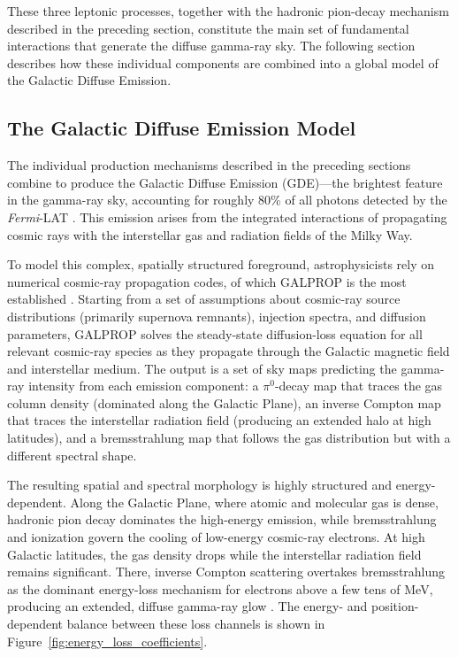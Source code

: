 These three leptonic processes, together with the hadronic pion-decay mechanism described in the preceding section, constitute the main set of fundamental interactions that generate the diffuse gamma-ray sky.
The following section describes how these individual components are combined into a global model of the Galactic Diffuse Emission.

\subsection{The Galactic Diffuse Emission Model}
\label{sec:gde_model}

The individual production mechanisms described in the preceding sections combine to produce the Galactic Diffuse Emission (GDE)---the brightest feature in the gamma-ray sky, accounting for roughly 80\% of all photons detected by the \textit{Fermi}-LAT \cite{Ackermann:2014usa, DGRB-review}.
This emission arises from the integrated interactions of propagating cosmic rays with the interstellar gas and radiation fields of the Milky Way.

To model this complex, spatially structured foreground, astrophysicists rely on numerical cosmic-ray propagation codes, of which GALPROP is the most established \cite{Strong:2007nh}.
Starting from a set of assumptions about cosmic-ray source distributions (primarily supernova remnants), injection spectra, and diffusion parameters, GALPROP solves the steady-state diffusion-loss equation for all relevant cosmic-ray species as they propagate through the Galactic magnetic field and interstellar medium.
The output is a set of sky maps predicting the gamma-ray intensity from each emission component: a $\pi^0$-decay map that traces the gas column density (dominated along the Galactic Plane), an inverse Compton map that traces the interstellar radiation field (producing an extended halo at high latitudes), and a bremsstrahlung map that follows the gas distribution but with a different spectral shape.

The resulting spatial and spectral morphology is highly structured and energy-dependent.
Along the Galactic Plane, where atomic and molecular gas is dense, hadronic pion decay dominates the high-energy emission, while bremsstrahlung and ionization govern the cooling of low-energy cosmic-ray electrons.
At high Galactic latitudes, the gas density drops while the interstellar radiation field remains significant.
There, inverse Compton scattering overtakes bremsstrahlung as the dominant energy-loss mechanism for electrons above a few tens of MeV, producing an extended, diffuse gamma-ray glow \cite{Pinetti:2021jjs}.
The energy- and position-dependent balance between these loss channels is shown in Figure~\ref{fig:energy_loss_coefficients}.

